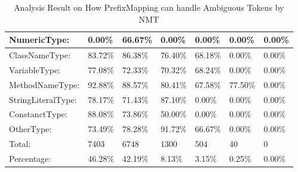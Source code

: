 \begin{table*}[]
\begin{tabular}{|l|l|l|l|l|l|l|}
NumericType:                               & 0.00\%             & 66.67\%            & 0.00\%             & 0.00\%             & 0.00\%             & 0.00\%                    \\ \hline
ClassNameType:                             & 83.72\%            & 86.38\%            & 76.40\%            & 68.18\%            & 0.00\%             & 0.00\%                    \\ \hline
VariableType:                              & 77.08\%            & 72.33\%            & 70.32\%            & 68.24\%            & 0.00\%             & 0.00\%                    \\ \hline
MethodNameType:                            & 92.88\%            & 88.57\%            & 80.41\%            & 67.58\%            & 77.50\%            & 0.00\%                    \\ \hline
StringLiteralType:                         & 78.17\%            & 71.43\%            & 87.10\%            & 0.00\%             & 0.00\%             & 0.00\%                    \\ \hline
ConstanctType:                             & 88.08\%            & 73.86\%            & 50.00\%            & 0.00\%             & 0.00\%             & 0.00\%                    \\ \hline
OtherType:                                 & 73.49\%            & 78.28\%            & 91.72\%            & 66.67\%            & 0.00\%             & 0.00\%                    \\ \hline
Total:                                     & 7403               & 6748               & 1300               & 504                & 40                 & 0                         \\ \hline
Percentage:                                & 46.28\%            & 42.19\%            & 8.13\%             & 3.15\%             & 0.25\%             & 0.00\%                    \\ \hline
\end{tabular}
\caption{Analysis Result on How PrefixMapping can handle Ambiguous Tokens by NMT}
\label{tblAnaPercentageMappingNeuralMT}
\end{table*}
